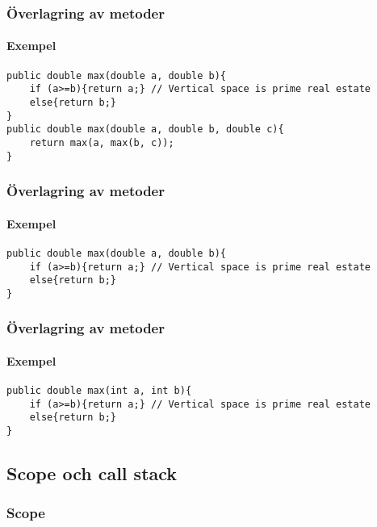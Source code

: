 \documentclass[aspectratio=169]{beamer}
\begin{document}
\begin{frame}[fragile]
    \frametitle{Överlagring av metoder}
    \framesubtitle{Exempel}

    \begin{lstlisting}
public double max(double a, double b){
    if (a>=b){return a;} // Vertical space is prime real estate
    else{return b;}
}
public double max(double a, double b, double c){
    return max(a, max(b, c));
}
    \end{lstlisting}


\end{frame}

\begin{frame}[fragile]
    \frametitle{Överlagring av metoder}
    \framesubtitle{Exempel}

    \begin{lstlisting}
public double max(double a, double b){
    if (a>=b){return a;} // Vertical space is prime real estate
    else{return b;}
}
    \end{lstlisting}


\end{frame}

\begin{frame}[fragile]
    \frametitle{Överlagring av metoder}
    \framesubtitle{Exempel}


    \begin{lstlisting}
public double max(int a, int b){
    if (a>=b){return a;} // Vertical space is prime real estate
    else{return b;}
}
    \end{lstlisting}

\end{frame}

\subsection{Scope och call stack}

\begin{frame}
    \frametitle{Scope}
    




\end{frame}
\end{document}

